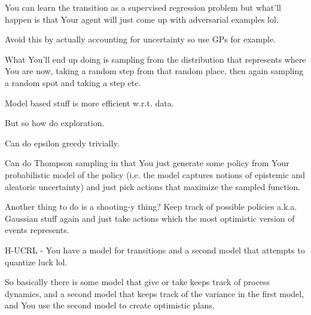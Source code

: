 \documentclass{article}
\begin{document}
		You can learn the transition as a supervised regression problem but what'll happen is that Your agent will just come up with adversarial examples lol.
		
		Avoid this by actually accounting for uncertainty so use GPs for example.
		
		What You'll end up doing is sampling from the distribution that represents where You are now, taking a random step from that random place, then again sampling a random spot and taking a step etc.
		
		Model based stuff is more efficient w.r.t. data.
		
		But so how do exploration.
		
		Can do epsilon greedy trivially.
		
		Can do Thompson sampling in that You just generate some policy from Your probabilistic model of the policy (i.e. the model captures notions of epistemic and aleatoric uncertainty) and just pick actions that maximize the sampled function.
		
		Another thing to do is a shooting-y thing? Keep track of possible policies a.k.a. Gaussian stuff again and just take actions which the most optimistic version of events represents.
		
		H-UCRL - You have a model for transitions and a second model that attempts to quantize luck lol.
		
		So basically there is some model that give or take keeps track of process dynamics, and a second model that keeps track of the variance in the first model, and You use the second model to create optimistic plans.
		
		
		
		
			
\end{document}
